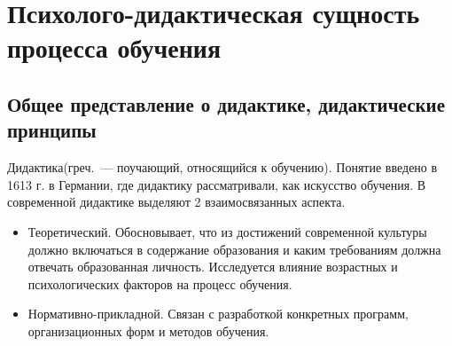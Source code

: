 \section{Психолого-дидактическая сущность процесса обучения}
\subsection{Общее представление о дидактике, дидактические принципы}
Дидактика(греч.~--- поучающий, относящийся к обучению). Понятие введено в 1613 г. в Германии, где дидактику рассматривали, как искусство обучения. В современной дидактике выделяют 2 взаимосвязанных аспекта.
\begin{itemize}
	\item Теоретический. Обосновывает, что из достижений современной культуры должно включаться в содержание образования и каким требованиям должна отвечать образованная личность. Исследуется влияние возрастных и психологических факторов на процесс обучения.
	\item Нормативно-прикладной. Связан с разработкой конкретных программ, организационных форм и методов обучения.
\end{itemize}

